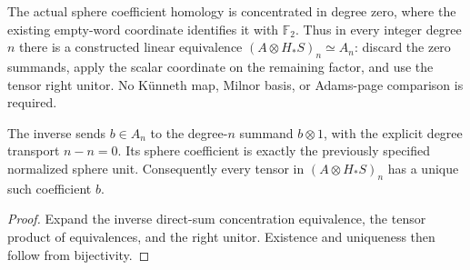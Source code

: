 \begin{definition}
  \label{def:h6-sphere-tensor-coefficient}
  \leanok
  The actual sphere coefficient homology is concentrated in degree zero,
  where the existing empty-word coordinate identifies it with $\mathbb F_2$.
  Thus in every integer degree $n$ there is a constructed linear equivalence
  $(A\otimes H_*S)_n\simeq A_n$: discard the zero summands, apply the scalar
  coordinate on the remaining factor, and use the tensor right unitor.
  No K\"unneth map, Milnor basis, or Adams-page comparison is required.
\end{definition}

\begin{proposition}
  \label{prop:h6-sphere-tensor-coefficient}
  \leanok
  The inverse sends $b\in A_n$ to the degree-$n$ summand $b\otimes1$,
  with the explicit degree transport $n-n=0$. Its sphere coefficient is
  exactly the previously specified normalized sphere unit. Consequently
  every tensor in $(A\otimes H_*S)_n$ has a unique such coefficient $b$.
\end{proposition}
\begin{proof}
  Expand the inverse direct-sum concentration equivalence, the tensor
  product of equivalences, and the right unitor. Existence and uniqueness
  then follow from bijectivity.
  \leanok
\end{proof}

